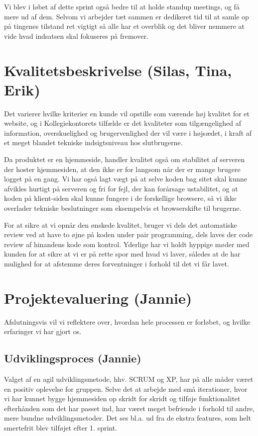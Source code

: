 \documentclass[12pt, a4paper]{report}
\begin{document}
Vi blev i løbet af dette sprint også bedre til at holde standup meetings, og få mere ud af dem. Selvom vi arbejder tæt sammen er dedikeret tid til at samle op på tingenes tilstand ret vigtigt så alle har et overblik og det bliver nemmere at vide hvad indsatsen skal fokuseres på fremover.

\section{Kvalitetsbeskrivelse (Silas, Tina, Erik)}
Det varierer hvilke kriterier en kunde vil opstille som værende høj kvalitet for et website, og i Kollegiekontorets tilfælde er det kvaliteter som tilgængelighed af information, overskuelighed og brugervenlighed der vil være i højsædet, i kraft af et meget blandet tekniske indsigtsniveau hos slutbrugerne.


Da produktet er en hjemmeside, handler kvalitet også om stabilitet af serveren der hoster hjemmesiden, at den ikke er for langsom når der er mange brugere logget på en gang. Vi har også lagt vægt på at selve koden bag sitet skal kunne afvikles hurtigt på serveren og fri for fejl, der kan forårsage ustabilitet, og at koden på klient-siden skal kunne fungere i de forskellige browsere, så vi ikke overlader tekniske beslutninger som eksempelvis et browserskifte til brugerne.


For at sikre at vi opnår den ønskede kvalitet, bruger vi dels det automatiske review ved at have to øjne på koden under pair programming, dels laves der code review af hinandens kode som kontrol. Yderlige har vi holdt hyppige møder med kunden for at sikre at vi er på rette spor med hvad vi laver, således at de har mulighed for at afstemme deres forventninger i forhold til det vi får lavet.


\section{Projektevaluering (Jannie)}
Afslutningsvis vil vi reflektere over, hvordan hele processen er forløbet, og hvilke erfaringer vi har gjort os.

\subsection{Udviklingsproces (Jannie)}
Valget af en agil udviklingsmetode, hhv. SCRUM og XP, har på alle måder været en positiv oplevelse for gruppen. Selve det at arbejde med små iterationer, hvor vi har kunnet bygge hjemmesiden op skridt for skridt og tilføje funktionalitet efterhånden som det har passet ind, har været meget befriende i forhold til andre, mere bundne udviklingsmetoder. Det ses bl.a. ud fra de ekstra features, som helt smertefrit blev tilføjet efter 1. sprint.
\end{document}
